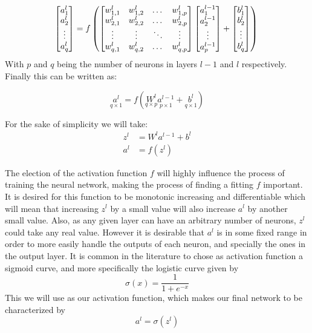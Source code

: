 \documentclass[a4paper, 12pt]{amsart}
\begin{document}
\begin{equation*}
  \begin{bmatrix}
    a^l_1\\
    a^l_2\\
    \vdots\\
    a^l_q
  \end{bmatrix}
  =
  f\left(
    \begin{bmatrix}
      w^l_{1,1} & w^l_{1,2} & \dots & w^l_{1,p}\\
      w^l_{2,1} & w^l_{2,2} & \dots & w^l_{2,p}\\
      \vdots    & \vdots    & \ddots& \vdots   \\
      w^l_{q,1} & w^l_{q,2} & \dots & w^l_{q,p}\\
    \end{bmatrix}
    \begin{bmatrix}
      a^{l-1}_1\\
      a^{l-1}_2\\
      \vdots\\
      a^{l-1}_p
    \end{bmatrix}
    +
    \begin{bmatrix}
      b^l_1\\
      b^l_2\\
      \vdots\\
      b^l_q
    \end{bmatrix}
  \right)\\
\end{equation*}
With $p$ and $q$ being the number of neurons in layers $l-1$ and $l$
respectively. Finally this can be written as:

\begin{equation*}
  \underset{q\times 1}{a^l}
  = f(\underset{q\times p}{W^l} \underset{p\times 1}{a^{l-1}}
  + \underset{q\times 1}{b^l})
\end{equation*}

For the sake of simplicity we will take:
\begin{align*}
  z^l &= W^la^{l-1}+b^l\\
  a^l &= f(z^l)
\end{align*}

The election of the activation function $f$ will highly influence the process
of training the neural network, making the process of finding a fitting $f$
important.
It is desired for this function to be monotonic increasing and differentiable
which will mean that increasing $z^l$ by a small value will also increase
$a^l$ by another small value.
Also, as any given layer can have an arbitrary number of neurons, $z^l$ could
take any real value. However it is desirable that $a^l$ is in some fixed range
in order to more easily handle the outputs of each neuron, and specially the
ones in the output layer.
It is common in the literature to chose as activation function a sigmoid curve,
and more specifically the logistic curve given by
\begin{equation*}
  \sigma(x)=\frac{1}{1+e^{-x}}
\end{equation*}
This we will use as our activation function, which makes our final network to
be characterized by
\begin{equation*}
  a^l=\sigma(z^l)
\end{equation*}
\end{document}
